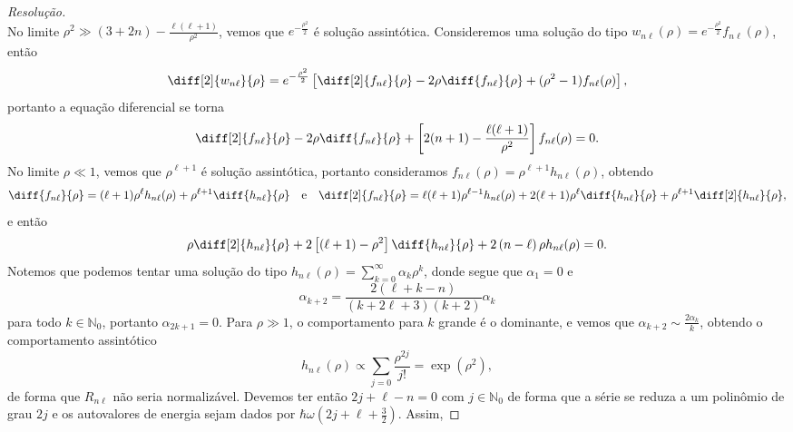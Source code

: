 \begin{proof}[Resolução]
\begin{equation*}
    \end{equation*}
    No limite \(\rho^2 \gg (3+2n) - \frac{\ell(\ell+1)}{\rho^2}\), vemos que \(e^{-\frac{\rho^2}{2}}\) é solução assintótica. Consideremos uma solução do tipo \(w_{n\ell}(\rho) = e^{-\frac{\rho^2}{2}}f_{n \ell}(\rho)\), então
    \begin{equation*}
        \diff[2]{w_{n\ell}}{\rho} = e^{-\frac{\rho^2}{2}} \left[\diff[2]{f_{n\ell}}{\rho} - 2\rho \diff{f_{n\ell}}{\rho} + (\rho^2 - 1)f_{n\ell}(\rho)\right],
    \end{equation*}
    portanto a equação diferencial se torna
    \begin{equation*}
        \diff[2]{f_{n\ell}}{\rho} - 2\rho \diff{f_{n\ell}}{\rho} + \left[2(n+1) - \frac{\ell (\ell + 1)}{\rho^2}\right]f_{n\ell}(\rho) = 0.
    \end{equation*}
    No limite \(\rho \ll 1\), vemos que \(\rho^{\ell + 1}\) é solução assintótica, portanto consideramos \(f_{n\ell}(\rho) = \rho^{\ell+1} h_{n\ell}(\rho)\), obtendo
    \begin{equation*}
        \diff{f_{n\ell}}{\rho} = (\ell+1) \rho^\ell h_{n\ell}(\rho) + \rho^{\ell + 1}\diff{h_{n\ell}}{\rho}\quad\text{e}\quad
        \diff[2]{f_{n\ell}}{\rho} = \ell(\ell+1) \rho^{\ell-1} h_{n\ell}(\rho) + 2(\ell + 1)\rho^{\ell}\diff{h_{n\ell}}{\rho} + \rho^{\ell + 1}\diff[2]{h_{n\ell}}{\rho},
    \end{equation*}
    e então
    \begin{equation*}
        \rho\diff[2]{h_{n\ell}}{\rho} + 2\left[(\ell + 1) - \rho^{2}\right]\diff{h_{n\ell}}{\rho} + 2\left(n  - \ell\right)\rho h_{n\ell}(\rho) = 0.
    \end{equation*}
    Notemos que podemos tentar uma solução do tipo \(h_{n\ell}(\rho) = \sum_{k = 0}^\infty \alpha_k \rho^{k}\), donde segue que \(\alpha_1 = 0\) e
    \begin{equation*}
        \alpha_{k+2} = \frac{2(\ell + k - n)}{(k + 2\ell + 3)(k + 2)}\alpha_{k}
    \end{equation*}
    para todo \(k \in \mathbb{N}_0\), portanto \(\alpha_{2k + 1} = 0.\) Para \(\rho \gg 1\), o comportamento para \(k\) grande é o dominante, e vemos que \(\alpha_{k+2} \sim \frac{2\alpha_k}{k}\), obtendo o comportamento assintótico
    \begin{equation*}
        h_{n\ell}(\rho) \propto \sum_{j = 0} \frac{\rho^{2j}}{j!} = \exp(\rho^2),
    \end{equation*}
    de forma que \(R_{n\ell}\) não seria normalizável. Devemos ter então \(2j + \ell - n = 0\) com \(j\in \mathbb{N}_0\) de forma que a série se reduza a um polinômio de grau \(2j\) e os autovalores de energia sejam dados por \(\hbar \omega \left(2j + \ell + \frac32\right)\). Assim,

\end{proof}
